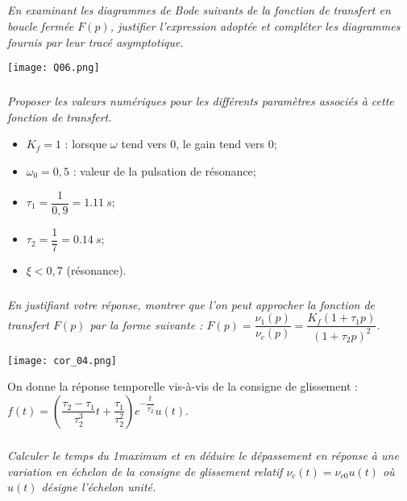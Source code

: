 \begin{multicols}{2}
\fi

\subparagraph{}\textit{En examinant les diagrammes de Bode suivants de la fonction de transfert en boucle fermée $F(p)$, justifier l’expression adoptée et
compléter les diagrammes fournis par leur tracé asymptotique.}

\ifprof
\else
\begin{center}
\texttt{[image: Q06.png]}
\end{center}
\fi


\ifprof
\begin{corrige}
\end{corrige}
\else
\fi


\subparagraph{}\textit{Proposer les valeurs numériques pour les différents paramètres associés à
cette fonction de transfert.}
\ifprof
\begin{corrige}
\begin{itemize}
\item $K_f=1$ : lorsque $\omega$ tend vers 0, le gain tend vers 0;
\item $\omega_0  = 0,5$ : valeur de la pulsation de résonance; 
\item $\tau_1 = \dfrac{1}{0,9}=\SI{1,11}{s}$;
\item $\tau_2 = \dfrac{1}{7} =\SI{0,14}{s}$;
\item $\xi<0,7$ (résonance).
\end{itemize}
\end{corrige}
\else
\fi


\subparagraph{}\textit{En justifiant votre réponse, montrer que l’on peut approcher la fonction de
transfert $F(p)$ par la forme suivante : $ F(p)=\dfrac{\nu_1(p)}{\nu_c(p)}=\dfrac{K_f\left( 1+\tau_1 p\right)}{\left( 1+\tau_2 p\right)^2 } $.}
\ifprof
\begin{corrige}

\begin{center}
\texttt{[image: cor\_04.png]}
\end{center}
\end{corrige}
\else
\fi

On donne la réponse temporelle vis-à-vis de la consigne de glissement : $f(t)=\left( \dfrac{\tau_2 - \tau_1 }{\tau_2^3 }t +\dfrac{\tau_1}{\tau_2^2} \right)e^{-\dfrac{t}{\tau_2}} u(t)$.




\subparagraph{}\textbf{ \; } \textit{Calculer le temps du 1\ier maximum et en déduire le
dépassement en réponse à une variation en échelon de la consigne de glissement
relatif $\nu_c(t)=\nu_{c0}u(t)$ où $u(t)$ désigne l’échelon unité.}
\ifprof
\begin{corrige}


\end{corrige}
\end{multicols}
